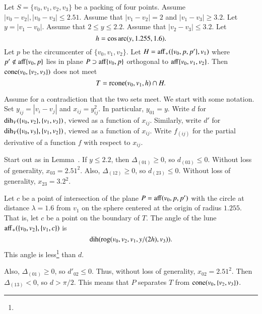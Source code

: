 \begin{tarskidata}
\begin{tarski}

\begin{lemma} 
Let $S=\{v_0,v_1,v_2,v_3\}$ be a packing of four points.
Assume $|v_0-v_2|,|v_0-v_3|\le 2.51$.
Assume that
$|v_1-v_2|=2$ and $|v_1-v_3|\ge3.2$.
Let $y = |v_1-v_0|$.
Assume that $2\le y\le 2.2$.
Assume that $|v_2-v_3|\le 3.2$.
Let 
$$
  h=\cos\operatorname{arc}(y,1.255,1.6).
$$
Let  $p$ be the circumcenter
of $\{v_0,v_1,v_2\}$.
Let $H = {\operatorname{aff}}_+(\{v_0,p,p'\},v_1)$ where $p'\not\in{\operatorname{aff}}\{v_0,p\}$ lies in
plane $P\supset{\operatorname{aff}}\{v_0,p\} $ orthogonal to ${\operatorname{aff}}\{v_0,v_1,v_2\}$.
Then ${\operatorname{cone}}(v_0,\{v_2,v_3\})$ does not meet
$$
  T={\operatorname{rcone}}(v_0,v_1,h) \cap H.
$$
\end{lemma}

\begin{proved} Assume for a contradiction that the two sets meet.  
We start with some notation.
Set $y_{ij}=|v_i-v_j|$ and $x_{ij} =y_{ij}^2$.  In particular, $y_{01}=y$.
Write $d$ for $\operatorname{dih}_V(\{v_0,v_2\},\{v_1,v_3\})$, viewed as a function
of $x_{ij}$.
Similarly, write $d'$ for $\operatorname{dih}_V(\{v_0,v_3\},\{v_1,v_2\})$, 
viewed as a function
of $x_{ij}$.
Write $f_{(ij)}$ for the
partial derivative of a function $f$ with respect to $x_{ij}$. 

Start out as in Lemma~. 
If $y\le 2.2$, then $\Delta_{(01)}\ge0$, so
    $d_{(03)}\le 0$.
Without loss of generality, $x_{03}=2.51^2$. Also, $\Delta_{(12)}\ge0$, so
    $d_{(23)}\le0$.
Without loss of generality, $x_{23}=3.2^2$.

Let $c$ be a point of intersection of the plane $P={\operatorname{aff}}(v_0,p,p')$ with
the circle at distance $\lambda=1.6$ from $v_1$ on the sphere centered
at the origin of radius $1.255$.  That is, let $c$ be a point on the boundary
of $T$.  The angle of the lune ${\operatorname{aff}}_+(\{v_0,v_2\},\{v_1,c\})$
is 
    $$\operatorname{dih}({\operatorname{rog}}(v_0,v_2,v_1,y/(2 h),v_3)).$$
This angle is less\footnote{} %
than $d$. 

Also, $\Delta_{(01)}\ge0$, so $d'_{02}\le 0$.  Thus, without loss of generality, 
$x_{02}=2.51^2$. Then
$\Delta_{(13)}<0$, so $d >\pi/2$.  This means that $P$
separates $T$ from ${\operatorname{cone}}(v_0,\{v_2,v_3\})$. 
\swallowed\end{proved}
\end{tarski}






\end{tarskidata}
